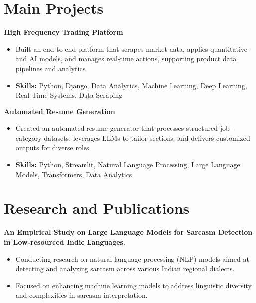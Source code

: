 \documentclass[a4paper,11pt]{article}
\begin{document}
\section{\textbf{Main Projects}}

\vspace{1mm}
  \textbf{High Frequency Trading Platform  }
\vspace{-1.5mm} %
\begin{itemize}
  \item Built an end-to-end platform that scrapes market data, applies quantitative and AI models, and manages real-time actions, supporting product data pipelines and analytics.
\vspace{-3mm}
  \item \textbf{Skills:} Python, Django, Data Analytics, Machine Learning, Deep Learning, Real-Time Systems, Data Scraping
\end{itemize}


\vspace{1mm}
   \textbf{Automated Resume Generation }
\vspace{-1.5mm} %
\begin{itemize}
  \item Created an automated resume generator that processes structured job-category datasets, leverages LLMs to tailor sections, and delivers customized outputs for diverse roles.
\vspace{-3mm}
  \item \textbf{Skills:} Python, Streamlit, Natural Language Processing, Large Language Models, Transformers, Data Analytics
\end{itemize}



\section{\textbf{Research and Publications} \hfill }
\vspace{1mm}
  \textbf{An Empirical Study on Large Language Models for Sarcasm Detection in Low-resourced Indic Languages}.
\vspace{-1mm} %
\begin{itemize}
  \item Conducting research on natural language processing (NLP) models aimed at detecting and analyzing sarcasm across various Indian regional dialects.
\vspace{-3mm}
  \item Focused on enhancing machine learning models to address linguistic diversity and complexities in sarcasm interpretation.
\end{itemize}
\end{document}
